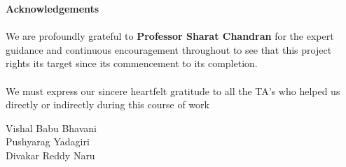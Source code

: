 \begin{center}
\thispagestyle{empty}
\LARGE{\textbf{Acknowledgements}}\\[1cm]
\end{center}
\linespread{1.13}
\large{\paragraph{}We are profoundly grateful to \textbf{Professor Sharat Chandran} for the expert guidance
and continuous encouragement throughout to see that this project rights its
target since its commencement to its completion.}
\large{\paragraph{}We must express our sincere heartfelt gratitude to all the TA's who helped us directly or indirectly during this course of work}

\begin{flushright}
{
Vishal Babu Bhavani\\
Pushyarag Yadagiri\\
Divakar Reddy Naru\\

}
\end{flushright}
\newpage
